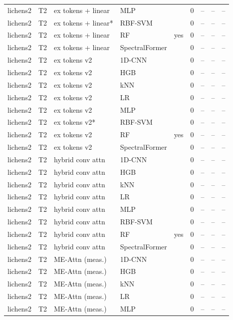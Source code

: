 \begin{tabular}{lllllcccc}
lichens2 & T2 & ex tokens + linear & MLP &  & 0 & -- & -- & -- \\
lichens2 & T2 & ex tokens + linear* & RBF-SVM &  & 0 & -- & -- & -- \\
lichens2 & T2 & ex tokens + linear & RF & yes & 0 & -- & -- & -- \\
lichens2 & T2 & ex tokens + linear & SpectralFormer &  & 0 & -- & -- & -- \\
lichens2 & T2 & ex tokens v2 & 1D-CNN &  & 0 & -- & -- & -- \\
lichens2 & T2 & ex tokens v2 & HGB &  & 0 & -- & -- & -- \\
lichens2 & T2 & ex tokens v2 & kNN &  & 0 & -- & -- & -- \\
lichens2 & T2 & ex tokens v2 & LR &  & 0 & -- & -- & -- \\
lichens2 & T2 & ex tokens v2 & MLP &  & 0 & -- & -- & -- \\
lichens2 & T2 & ex tokens v2* & RBF-SVM &  & 0 & -- & -- & -- \\
lichens2 & T2 & ex tokens v2 & RF & yes & 0 & -- & -- & -- \\
lichens2 & T2 & ex tokens v2 & SpectralFormer &  & 0 & -- & -- & -- \\
lichens2 & T2 & hybrid conv attn & 1D-CNN &  & 0 & -- & -- & -- \\
lichens2 & T2 & hybrid conv attn & HGB &  & 0 & -- & -- & -- \\
lichens2 & T2 & hybrid conv attn & kNN &  & 0 & -- & -- & -- \\
lichens2 & T2 & hybrid conv attn & LR &  & 0 & -- & -- & -- \\
lichens2 & T2 & hybrid conv attn & MLP &  & 0 & -- & -- & -- \\
lichens2 & T2 & hybrid conv attn & RBF-SVM &  & 0 & -- & -- & -- \\
lichens2 & T2 & hybrid conv attn & RF & yes & 0 & -- & -- & -- \\
lichens2 & T2 & hybrid conv attn & SpectralFormer &  & 0 & -- & -- & -- \\
lichens2 & T2 & ME-Attn (meas.) & 1D-CNN &  & 0 & -- & -- & -- \\
lichens2 & T2 & ME-Attn (meas.) & HGB &  & 0 & -- & -- & -- \\
lichens2 & T2 & ME-Attn (meas.) & kNN &  & 0 & -- & -- & -- \\
lichens2 & T2 & ME-Attn (meas.) & LR &  & 0 & -- & -- & -- \\
lichens2 & T2 & ME-Attn (meas.) & MLP &  & 0 & -- & -- & -- \\

\end{tabular}
